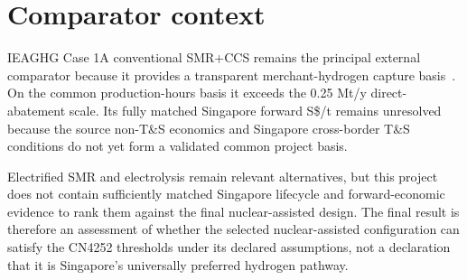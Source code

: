 \section{Comparator context}
IEAGHG Case 1A conventional SMR+CCS remains the principal external comparator because it provides a transparent merchant-hydrogen capture basis~\cite{ieaghg2017smr}. On the common production-hours basis it exceeds the 0.25 Mt/y direct-abatement scale. Its fully matched Singapore forward S\$/t remains unresolved because the source non-T\&S economics and Singapore cross-border T\&S conditions do not yet form a validated common project basis.

Electrified SMR and electrolysis remain relevant alternatives, but this project does not contain sufficiently matched Singapore lifecycle and forward-economic evidence to rank them against the final nuclear-assisted design. The final result is therefore an assessment of whether the selected nuclear-assisted configuration can satisfy the CN4252 thresholds under its declared assumptions, not a declaration that it is Singapore's universally preferred hydrogen pathway.
